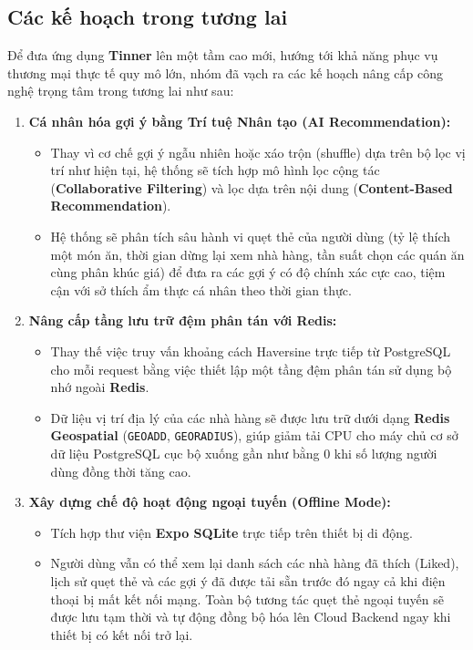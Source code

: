 \subsection{Các kế hoạch trong tương lai}
\label{subsec:future_plans}

Để đưa ứng dụng \textbf{Tinner} lên một tầm cao mới, hướng tới khả năng phục vụ thương mại thực tế quy mô lớn, nhóm đã vạch ra các kế hoạch nâng cấp công nghệ trọng tâm trong tương lai như sau:

\begin{enumerate}
    \item \textbf{Cá nhân hóa gợi ý bằng Trí tuệ Nhân tạo (AI Recommendation):}
    \begin{itemize}
        \item Thay vì cơ chế gợi ý ngẫu nhiên hoặc xáo trộn (shuffle) dựa trên bộ lọc vị trí như hiện tại, hệ thống sẽ tích hợp mô hình lọc cộng tác (\textbf{Collaborative Filtering}) và lọc dựa trên nội dung (\textbf{Content-Based Recommendation}).
        \item Hệ thống sẽ phân tích sâu hành vi quẹt thẻ của người dùng (tỷ lệ thích một món ăn, thời gian dừng lại xem nhà hàng, tần suất chọn các quán ăn cùng phân khúc giá) để đưa ra các gợi ý có độ chính xác cực cao, tiệm cận với sở thích ẩm thực cá nhân theo thời gian thực.
    \end{itemize}
    
    \item \textbf{Nâng cấp tầng lưu trữ đệm phân tán với Redis:}
    \begin{itemize}
        \item Thay thế việc truy vấn khoảng cách Haversine trực tiếp từ PostgreSQL cho mỗi request bằng việc thiết lập một tầng đệm phân tán sử dụng bộ nhớ ngoài \textbf{Redis}.
        \item Dữ liệu vị trí địa lý của các nhà hàng sẽ được lưu trữ dưới dạng \textbf{Redis Geospatial} (\texttt{GEOADD}, \texttt{GEORADIUS}), giúp giảm tải CPU cho máy chủ cơ sở dữ liệu PostgreSQL cục bộ xuống gần như bằng 0 khi số lượng người dùng đồng thời tăng cao.
    \end{itemize}

    \item \textbf{Xây dựng chế độ hoạt động ngoại tuyến (Offline Mode):}
    \begin{itemize}
        \item Tích hợp thư viện \textbf{Expo SQLite} trực tiếp trên thiết bị di động.
        \item Người dùng vẫn có thể xem lại danh sách các nhà hàng đã thích (Liked), lịch sử quẹt thẻ và các gợi ý đã được tải sẵn trước đó ngay cả khi điện thoại bị mất kết nối mạng. Toàn bộ tương tác quẹt thẻ ngoại tuyến sẽ được lưu tạm thời và tự động đồng bộ hóa lên Cloud Backend ngay khi thiết bị có kết nối trở lại.
    \end{itemize}


\end{enumerate}
